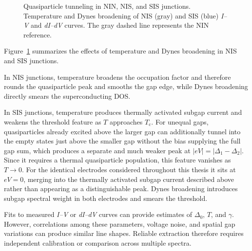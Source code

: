             \begin{figure}[t]
                \centering
                \hfill
                \hfill
                \caption{
                    Quasiparticle tunneling in NIN, NIS, and SIS junctions. Temperature and Dynes broadening of NIS (gray) and SIS (blue) \textit{I--V} and \textit{dI--dV} curves. The gray dashed line represents the NIN reference.
                    }
                \label{fig:micro:tunnel-iv-didv}
            \end{figure}

            Figure~\ref{fig:micro:tunnel-iv-didv} summarizes the effects of temperature and Dynes broadening in NIS and SIS junctions.

            In NIS junctions, temperature broadens the occupation factor and therefore rounds the quasiparticle peak and smooths the gap edge, while Dynes broadening directly smears the superconducting DOS.

            In SIS junctions, temperature produces thermally activated subgap current and weakens the threshold feature as $T$ approaches $T_\mathrm{c}$. For unequal gaps, quasiparticles already excited above the larger gap can additionally tunnel into the empty states just above the smaller gap without the bias supplying the full gap sum, which produces a separate and much weaker peak at $|eV|=|\Delta_1-\Delta_2|$. Since it requires a thermal quasiparticle population, this feature vanishes as $T\to0$. For the identical electrodes considered throughout this thesis it sits at $eV=0$, merging into the thermally activated subgap current described above rather than appearing as a distinguishable peak. Dynes broadening introduces subgap spectral weight in both electrodes and smears the threshold.

        Fits to measured \textit{I--V} or \textit{dI--dV} curves can provide estimates of $\Delta_0$, $T$, and $\gamma$. However, correlations among these parameters, voltage noise, and spatial gap variations can produce similar line shapes. Reliable extraction therefore requires independent calibration or comparison across multiple spectra.

